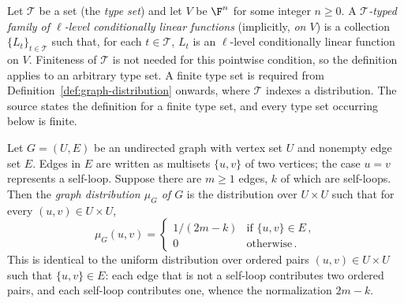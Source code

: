 \begin{definition}\label{def:typed-cl-functions}
	\leanok
	Let $\mathcal T$ be a set (the \emph{type set}) and let $V$ be $\F^n$ for some integer $n \ge 0$. A \emph{$\mathcal T$-typed family of $\ell$-level conditionally linear functions} (implicitly, \emph{on $V$}) is a collection $\{L_t\}_{t \in \mathcal T}$ such that, for each $t \in \mathcal T$, $L_t$ is an $\ell$-level conditionally linear function on $V$. Finiteness of $\mathcal T$ is not needed for this pointwise condition, so the definition applies to an arbitrary type set. A finite type set is required from Definition~\ref{def:graph-distribution} onwards, where $\mathcal T$ indexes a distribution. The source states the definition for a finite type set, and every type set occurring below is finite.
\end{definition}

\begin{definition}\label{def:graph-distribution}
	\leanok
	Let $G = (U, E)$ be an undirected graph with vertex set $U$ and nonempty edge set $E$. Edges in $E$ are written as multisets $\{u, v\}$ of two vertices; the case $u = v$ represents a self-loop. Suppose there are $m \ge 1$ edges, $k$ of which are self-loops. Then the \emph{graph distribution $\mu_G$ of $G$} is the distribution over $U \times U$ such that for every $(u,v) \in U \times U$,
	\[
		\mu_G(u, v) =
		\begin{cases}
			1/(2m-k) & \text{if } \{u,v\} \in E\,,\\
			0 & \text{otherwise}\,.
		\end{cases}
	\]
	This is identical to the uniform distribution over ordered pairs $(u,v) \in U \times U$ such that $\{u,v\} \in E$: each edge that is not a self-loop contributes two ordered pairs, and each self-loop contributes one, whence the normalization $2m-k$.
\end{definition}

